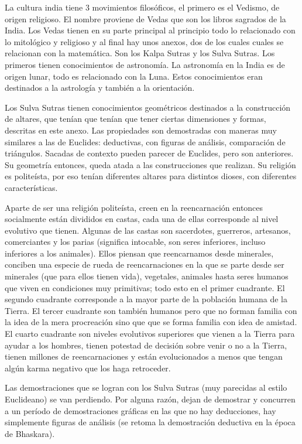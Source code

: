 La cultura india tiene 3 movimientos filosóficos, el primero es el Vedismo, de origen religioso. El nombre proviene de Vedas que son los libros sagrados de la India. Los Vedas tienen en su parte principal al principio todo lo relacionado con lo mitológico y religioso y al final hay unos anexos, dos de los cuales cuales se relacionan con la matemática. Son los Kalpa Sutras y los Sulva Sutras. Los primeros tienen conocimientos de astronomía. La astronomía en la India es de origen lunar, todo es relacionado con la Luna. Estos conocimientos eran destinados a la astrología y también a la orientación. 

Los Sulva Sutras tienen conocimientos geométricos destinados a la construcción de altares, que tenían que tenían que tener ciertas dimensiones y formas, descritas en este anexo. Las propiedades son demostradas con maneras muy similares a las de Euclides: deductivas, con figuras de análisis, comparación de triángulos. Sacadas de contexto pueden parecer de Euclides, pero son anteriores. Su geometría entonces, queda atada a las construcciones que realizan. Su religión es politeísta, por eso tenían diferentes altares para distintos dioses, con diferentes características.

Aparte de ser una religión politeísta, creen en la reencarnación entonces socialmente están divididos en castas, cada una de ellas corresponde al nivel evolutivo que tienen. Algunas de las castas son sacerdotes, guerreros, artesanos, comerciantes y los parias (significa intocable, son seres inferiores, incluso inferiores a los animales). Ellos piensan que reencarnamos desde minerales, conciben una especie de rueda de reencarnaciones en la que se parte desde ser minerales (que para ellos tienen vida), vegetales, animales hasta seres humanos que viven en condiciones muy primitivas; todo esto en el primer cuadrante. El segundo cuadrante corresponde a la mayor parte de la población humana de la Tierra. El tercer cuadrante son también humanos pero que no forman familia con la idea de la mera procreación sino que que se forma familia con idea de amistad. El cuarto cuadrante son niveles evolutivos superiores que vienen a la Tierra para ayudar a los hombres, tienen potestad de decisión sobre venir o no a la Tierra, tienen millones de reencarnaciones y están evolucionados a menos que tengan algún karma negativo que los haga retroceder. 

Las demostraciones que se logran con los Sulva Sutras (muy parecidas al estilo Euclideano) se van perdiendo. Por alguna razón, dejan de demostrar y concurren a un período de demostraciones gráficas en las que no hay deducciones, hay simplemente figuras de análisis (se retoma la demostración deductiva en la época de Bhaskara).
